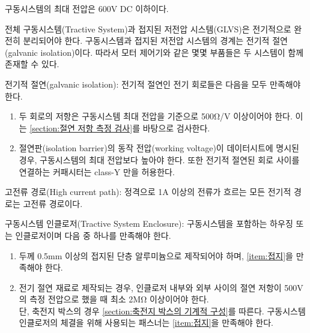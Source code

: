 \documentclass[final,a4paper,10pt]{report}
\begin{document}
\begin{enumerate}
  \item\label{rule:formula-technical.definitions.max-voltage-600vdc} {\color{blue} 구동시스템의 최대 전압은 600V DC 이하이다.} \label{item:구동시스템 최대 전압}

  \item\label{rule:formula-technical.definitions.ts-glvs-galvanic-isolation} 전체 구동시스템(Tractive System)과 접지된 저전압 시스템(GLVS)은 전기적으로 완전히 분리되어야 한다. 구동시스템과 접지된 저전압 시스템의 경계는 전기적 절연(galvanic isolation)이다. 따라서 모터 제어기와 같은 몇몇 부품들은 두 시스템이 함께 존재할 수 있다.

  \item\label{rule:formula-technical.definitions.galvanic-isolation-criteria} 전기적 절연(galvanic isolation): {\color{blue} 전기적 절연인 전기 회로들은 다음을 모두 만족해야 한다.}
    \begin{enumerate}
      \item\label{rule:formula-technical.definitions.galvanic-isolation-criteria.min-resistance-500ohmv} 두 회로의 저항은 구동시스템 최대 전압을 기준으로 500Ω/V 이상이어야 한다. 이는 \ref{section:절연 저항 측정 검사}를 바탕으로 검사한다.
      \item\label{rule:formula-technical.definitions.galvanic-isolation-criteria.class-y-capacitors-only} 절연판(isolation barrier)의 동작 전압(working voltage)이 데이터시트에 명시된 경우, 구동시스템의 최대 전압보다 높아야 한다. 또한 전기적 절연된 회로 사이를 연결하는 커패시터는 class-Y 만을 허용한다.
    \end{enumerate}

  \item\label{rule:formula-technical.definitions.high-current-path-1a} 고전류 경로(High current path): {\color{blue}정격으로 1A 이상의 전류가 흐르는 모든 전기적 경로는 고전류 경로이다.} \label{item:고전류 경로}
  {\color{blue}
  \item\label{rule:formula-technical.definitions.ts-enclosure} 구동시스템 인클로저(Tractive System Enclosure): 구동시스템을 포함하는 하우징 또는 인클로저이며 다음 중 하나를 만족해야 한다.
    \begin{enumerate}
      \item\label{rule:formula-technical.definitions.ts-enclosure.grounded-aluminum-enclosure} 두께 0.5mm 이상의 접지된 단층 알루미늄으로 제작되어야 하며, \ref{item:접지}을 만족해야 한다.
      \item\label{rule:formula-technical.definitions.ts-enclosure.min-resistance-2megaohm} 전기 절연 재료로 제작되는 경우, 인클로저 내부와 외부 사이의 절연 저항이 500V의 측정 전압으로 했을 때 최소 2MΩ 이상이어야 한다. \\
        단, 축전지 박스의 경우 \ref{section:축전지 박스의 기계적 구성}를 따른다. 구동시스템 인클로저의 체결을 위해 사용되는 패스너는 \ref{item:접지}을 만족해야 한다.
    \end{enumerate}
  }
\end{enumerate}
\end{document}
